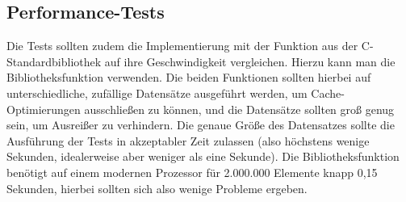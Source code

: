 \documentclass{article}
\begin{document}
	\subsection{Performance-Tests}
	Die Tests sollten zudem die Implementierung mit der Funktion  aus der C-Standardbibliothek auf ihre Geschwindigkeit vergleichen. Hierzu kann man die Bibliotheksfunktion  verwenden. Die beiden Funktionen sollten hierbei auf unterschiedliche, zufällige Datensätze ausgeführt werden, um Cache-Optimierungen ausschließen zu können, und die Datensätze sollten groß genug sein, um Ausreißer zu verhindern. Die genaue Größe des Datensatzes sollte die Ausführung der Tests in akzeptabler Zeit zulassen (also höchstens wenige Sekunden, idealerweise aber weniger als eine Sekunde). Die Bibliotheksfunktion  benötigt auf einem modernen Prozessor für 2.000.000 Elemente knapp 0,15 Sekunden, hierbei sollten sich also wenige Probleme ergeben.
\end{document}
